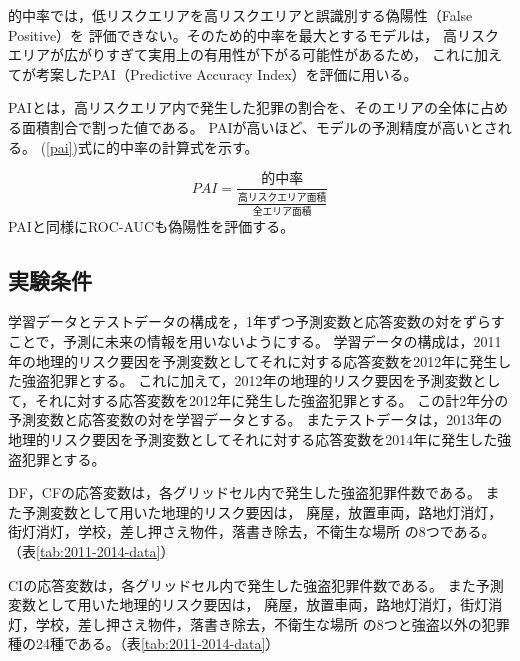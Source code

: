 的中率では，低リスクエリアを高リスクエリアと誤識別する偽陽性（False Positive）を
評価できない。そのため的中率を最大とするモデルは，
高リスクエリアが広がりすぎて実用上の有用性が下がる可能性があるため，
これに加えて\cite{chainey2008utility}が考案したPAI（Predictive Accuracy Index）を評価に用いる。

PAIとは，高リスクエリア内で発生した犯罪の割合を、そのエリアの全体に占める面積割合で割った値である。
PAIが高いほど、モデルの予測精度が高いとされる。
(\ref{pai})式に的中率の計算式を示す。

\begin{equation}\label{pai}
  PAI=\frac{的中率}{\frac{高リスクエリア面積}{全エリア面積}}
\end{equation}
PAIと同様にROC-AUCも偽陽性を評価する。

\subsection{実験条件}
学習データとテストデータの構成を，1年ずつ予測変数と応答変数の対をずらすことで，予測に未来の情報を用いないようにする。
学習データの構成は，2011年の地理的リスク要因を予測変数としてそれに対する応答変数を2012年に発生した強盗犯罪とする。
これに加えて，2012年の地理的リスク要因を予測変数として，それに対する応答変数を2012年に発生した強盗犯罪とする。
この計2年分の予測変数と応答変数の対を学習データとする。
またテストデータは，2013年の地理的リスク要因を予測変数としてそれに対する応答変数を2014年に発生した強盗犯罪とする。

DF，CFの応答変数は，各グリッドセル内で発生した強盗犯罪件数である。
また予測変数として用いた地理的リスク要因は，
廃屋，放置車両，路地灯消灯，街灯消灯，学校，差し押さえ物件，落書き除去，不衛生な場所
の8つである。（表\ref{tab:2011-2014-data}）

CIの応答変数は，各グリッドセル内で発生した強盗犯罪件数である。
また予測変数として用いた地理的リスク要因は，
廃屋，放置車両，路地灯消灯，街灯消灯，学校，差し押さえ物件，落書き除去，不衛生な場所
の8つと強盗以外の犯罪種の24種である。（表\ref{tab:2011-2014-data}）

